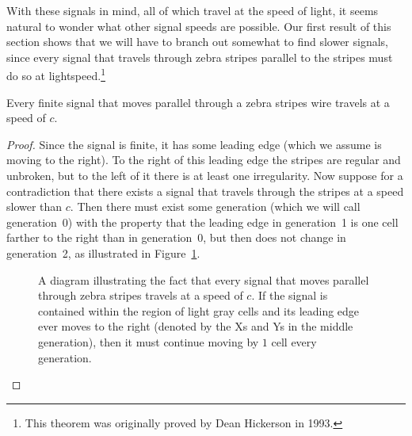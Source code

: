 With these signals in mind, all of which travel at the speed of light, it seems natural to wonder what other signal speeds are possible. Our first result of this section shows that we will have to branch out somewhat to find slower signals, since every signal that travels through zebra stripes parallel to the stripes must do so at lightspeed.\footnote{This theorem was originally proved by Dean Hickerson in 1993.}

\begin{theorem}\label{thm:speed_limit_zebra_fast}
	Every finite signal that moves parallel through a zebra stripes wire travels at a speed of $c$.
\end{theorem}

\begin{proof}
	Since the signal is finite, it has some leading edge (which we assume is moving to the right). To the right of this leading edge the stripes are regular and unbroken, but to the left of it there is at least one irregularity. Now suppose for a contradiction that there exists a signal that travels through the stripes at a speed slower than $c$. Then there must exist some generation (which we will call generation~0) with the property that the leading edge in generation~1 is one cell farther to the right than in generation~0, but then does not change in generation~2, as illustrated in Figure~\ref{fig:speed_limit_zebra_fast}.
	
	\begin{figure}[!htb]
		\centering
		    
		\caption{A diagram illustrating the fact that every signal that moves parallel through zebra stripes travels at a speed of $c$. If the signal is contained within the region of light gray cells and its leading edge ever moves to the right (denoted by the Xs and Ys in the middle generation), then it must continue moving by $1$ cell every generation.}\label{fig:speed_limit_zebra_fast}
	\end{figure}
	

\end{proof}
